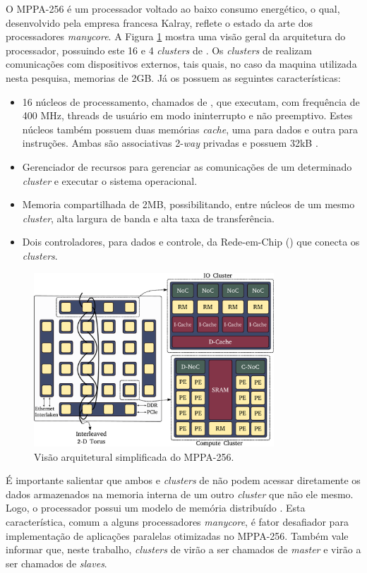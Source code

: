 \documentclass[a4paper,11pt]{article}
\newcommand{\mppa}{MPPA-256\xspace}
\newcommand{\manycore}{\textit{manycore}\xspace}
\begin{document}
O \mppa é um processador voltado ao baixo consumo energético, o qual, desenvolvido pela empresa francesa Kalray, reflete o estado da arte dos processadores \manycore. A Figura \ref{fig:mppaOverview} mostra uma visão geral da arquitetura do processador, possuindo este 16 \ccs e 4 \textit{clusters} de \io. 	Os \textit{clusters} de \io realizam comunicações com dispositivos externos, tais quais, no caso da maquina utilizada nesta pesquisa, memorias \lpddr de 2GB. Já os \ccs possuem as seguintes características:
\begin{itemize}
	\item 16 núcleos de processamento, chamados de \pes, que executam, com frequência de 400 MHz, threads de usuário em modo ininterrupto e não preemptivo. Estes núcleos também possuem duas memórias \textit{cache}, uma para dados e outra para instruções. Ambas são associativas 2-\textit{way} privadas	e possuem 32kB \cite{Podesta2018}.
	\item Gerenciador de recursos para gerenciar as comunicações de um determinado \textit{cluster} e executar o sistema operacional.
	\item Memoria compartilhada de 2MB, possibilitando, entre núcleos de um mesmo \textit{cluster}, alta largura de banda e alta taxa de transferência.
	\item Dois controladores, para dados e controle, da Rede-em-Chip (\noc) que conecta os \textit{clusters}.
\end{itemize}

\begin{figure}[h]
\centering
\includegraphics[width=9cm, keepaspectratio]{figs/mppa-overview.pdf}
\caption{Visão arquitetural simplificada do \mppa \cite{Penna2018}.}\par
\label{fig:mppaOverview}
\end{figure}

É importante salientar que ambos \ccs e \textit{clusters} de \io não podem acessar diretamente os dados armazenados na memoria interna de um outro \textit{cluster} que não ele mesmo. Logo, o processador possui um modelo de memória distribuído \cite{Castro-Souza-CCPE:2016, Podesta2018}. Esta característica, comum a alguns processadores \manycore, é fator desafiador para implementação de aplicações paralelas otimizadas no \mppa \cite{Castro-IA3-JPDC:2014}. Também vale informar que, neste trabalho, \textit{clusters} de \io virão a ser chamados de \textit{master} e \ccs virão a ser chamados de \textit{slaves}.
\end{document}

